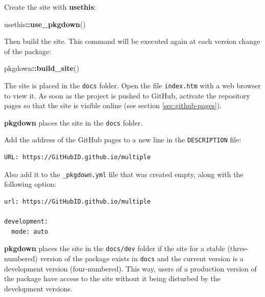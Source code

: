 \documentclass[
  12pt,
  american,
  a4paper,
  extrafontsizes,onecolumn,openright
  ]{memoir}
\newenvironment{Shaded}{\begin{snugshade}}{\end{snugshade}}
\newcommand{\FunctionTok}[1]{\textcolor[rgb]{0.13,0.29,0.53}{\textbf{#1}}}
\newcommand{\NormalTok}[1]{#1}
\newcommand{\SpecialCharTok}[1]{\textcolor[rgb]{0.81,0.36,0.00}{\textbf{#1}}}
\begin{document}
Create the site with \textbf{usethis}:

\scriptsize

\begin{Shaded}
\begin{Highlighting}[]
\NormalTok{usethis}\SpecialCharTok{::}\FunctionTok{use\_pkgdown}\NormalTok{()}
\end{Highlighting}
\end{Shaded}

\normalsize

Then build the site.
This command will be executed again at each version change of the package:

\scriptsize

\begin{Shaded}
\begin{Highlighting}[]
\NormalTok{pkgdown}\SpecialCharTok{::}\FunctionTok{build\_site}\NormalTok{()}
\end{Highlighting}
\end{Shaded}

\normalsize

The site is placed in the \texttt{docs} folder.
Open the file \texttt{index.htm} with a web browser to view it.
As soon as the project is pushed to GitHub, activate the repository pages so that the site is visible online (see section \ref{sec:github-pages}).

\textbf{pkgdown} places the site in the \texttt{docs} folder.

Add the address of the GitHub pages to a new line in the \texttt{DESCRIPTION} file:

\begin{verbatim}
URL: https://GitHubID.github.io/multiple
\end{verbatim}

Also add it to the \texttt{\_pkgdown.yml} file that was created empty, along with the following option:

\begin{verbatim}
url: https://GitHubID.github.io/multiple

development:
  mode: auto
\end{verbatim}

\textbf{pkgdown} places the site in the \texttt{docs/dev} folder if the site for a stable (three-numbered) version of the package exists in \texttt{docs} and the current version is a development version (four-numbered).
This way, users of a production version of the package have access to the site without it being disturbed by the development versions.
\end{document}
